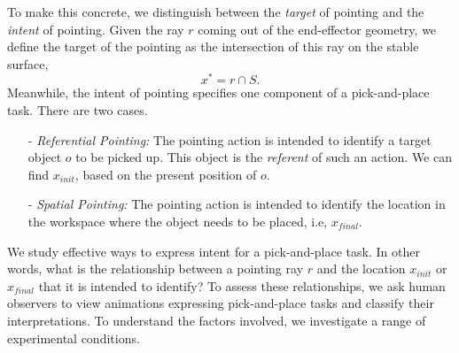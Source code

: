 To make this concrete, we distinguish between the \emph{target} of pointing and the \emph{intent} of pointing.
Given the ray $r$ coming out of the end-effector geometry, we define the target of the pointing as the intersection of this ray on the stable surface, $$x^*= r\cap S.$$
Meanwhile, the intent of pointing specifies one component of a pick-and-place task.  There are two cases.
\begin{itemize}
    \item [-] \textit{Referential Pointing:} The pointing action is intended to identify a target object $o$ to be picked up. This object is the \textit{referent} of such an action. We can find $x_{init}$, based on the present position of $o$.
    \item [-] \textit{Spatial Pointing:} The pointing action is intended to identify the location in the workspace where the object needs to be placed, i.e, $x_{final}$.
\end{itemize}

We study effective ways to express intent for a pick-and-place task. In other words, what is the relationship between a pointing ray $r$ and the location $x_{init}$ or $x_{final}$ that it is intended to identify?  To assess these relationships, we ask human observers to view animations expressing pick-and-place tasks and classify their interpretations.  To understand the factors involved, we investigate a range of experimental conditions.



